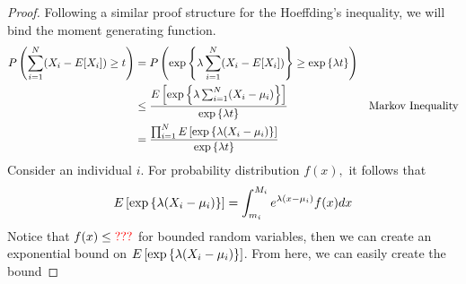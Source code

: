 \begin{proof}
    Following a similar proof structure for the Hoeffding's inequality, we will bind the moment generating function.  
    \begin{align*}
    P\left(\sum_{i=1}^{N}(X_i - E[X_i]) \geq t \right) &= P\left( \exp\left\{ \lambda\sum_{i=1}^{N}( X_i - E[X_i]) \right\} \geq \exp\left\{\lambda t \right\} \right) && 
        \text{}  \\
    &\leq \frac{ E\left[ \exp\left\{\lambda \sum_{i=1}^{N} (X_i - \mu_i ) \right\}  \right] }{ \exp\left\{\lambda t \right\} } && \text{Markov Inequality} \\ 
    &= \frac{ \prod_{i=1}^{N} E\left[\exp\left\{\lambda(X_i - \mu_i) \right\} \right] }{\exp\left\{\lambda t \right\}} && 
        \text{} \\
    \end{align*}
    Consider an individual $i$. For probability distribution $f(x),$ it follows that 
    \begin{align*}
    E\left[\exp\left\{\lambda(X_i - \mu_i) \right\} \right] = \int_{m_i}^{M_i} e^{\lambda(x - \mu_i)}f(x) dx
    \end{align*}
    Notice that $f(x) \leq \textcolor{red}{???}$ for bounded random variables, then we can create an exponential bound on $E\left[\exp\left\{\lambda(X_i - \mu_i) \right\} \right]$. From here, we can easily create the bound 
\end{proof}

